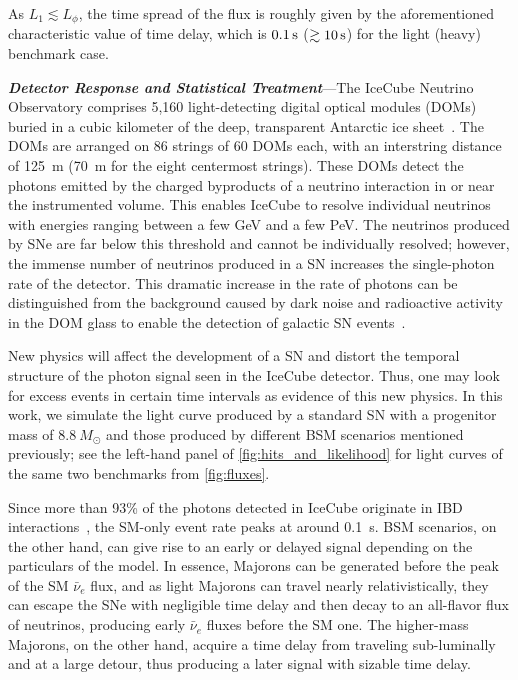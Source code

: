 \documentclass[aps,twocolumn,prl,showpacs,showkeys,preprintnumbers,superscriptaddress,nobibnotes,floatfix,longbibliography,notitlepage,nofootinbib]{revtex4-2}
\begin{document}
As $L_1\lesssim L_\phi$, the time spread of the flux is roughly given by the aforementioned characteristic value of time delay, which is $\unit[0.1]{s}$ ($\gtrsim\unit[10]{s}$) for the light (heavy) benchmark case.


\textbf{\textit{Detector Response and Statistical Treatment}}---The IceCube Neutrino Observatory comprises 5,160 light-detecting digital optical modules (DOMs) buried in a cubic kilometer of the deep, transparent Antarctic ice sheet~\cite{IceCube:2016zyt}.
The DOMs are arranged on 86 strings of 60 DOMs each, with an interstring distance of 125~m (70~m for the eight centermost strings).
These DOMs detect the photons emitted by the charged byproducts of a neutrino interaction in or near the instrumented volume.
This enables IceCube to resolve individual neutrinos with energies ranging between a few GeV and a few PeV.
The neutrinos produced by SNe are far below this threshold and cannot be individually resolved; however, the immense number of neutrinos produced in a SN increases the single-photon rate of the detector.
This dramatic increase in the rate of photons can be distinguished from the background caused by dark noise and radioactive activity in the DOM glass to enable the detection of galactic SN events~\cite{Griswold:2023iwz}.

New physics will affect the development of a SN and distort the temporal structure of the photon signal seen in the IceCube detector.
Thus, one may look for excess events in certain time intervals as evidence of this new physics.
In this work, we simulate the light curve produced by a standard SN with a progenitor mass of $8.8~M_{\odot}$ and those produced by different BSM scenarios mentioned previously; see the left-hand panel of \cref{fig:hits_and_likelihood} for light curves of the same two benchmarks from \cref{fig:fluxes}.

Since more than 93\% of the photons detected in IceCube originate in IBD interactions~\cite{IceCube:2011cwc}, the SM-only event rate peaks at around 0.1~s.
BSM scenarios, on the other hand, can give rise to an early or delayed signal depending on the particulars of the model.
In essence, Majorons can be generated before the peak of the SM $\bar{\nu}_{e}$ flux, and as light Majorons can travel nearly relativistically, they can escape the SNe with negligible time delay and then decay to an all-flavor flux of neutrinos, producing early $\bar{\nu}_{e}$ fluxes before the SM one.
The higher-mass Majorons, on the other hand, acquire a time delay from traveling sub-luminally and at a large detour, thus producing a later signal with sizable time delay.
\end{document}
